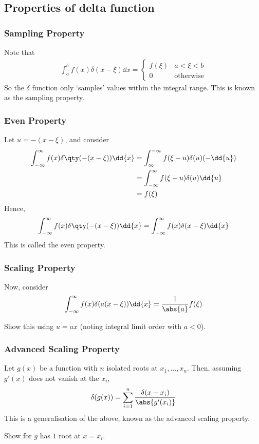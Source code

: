 \subsection{Properties of delta function}
\subsubsection{Sampling Property}
Note that
\begin{align} \label{eq:6.9}
	\int_a^b f(x) \delta(x-\xi) \dd{x} = \begin{cases}
		f(\xi) & a < \xi < b \\
		0 & \text{otherwise}
	\end{cases}
\end{align}
So the $\delta$ function only `samples' values within the integral range.
This is known as the sampling property.

\subsubsection{Even Property}
Let $u = -(x-\xi)$, and consider
\begin{align*}
	\int_{-\infty}^\infty f(x) \delta\qty(-(x-\xi)) \dd{x} &= \int_{\infty}^{-\infty} f(\xi - u) \delta(u) (-\dd{u}) \\
    &= \int_{-\infty}^\infty f(\xi - u) \delta(u) \dd{u} \\
    &= f(\xi)
\end{align*}
Hence,
\begin{align} \label{eq:6.10}
	\int_{-\infty}^\infty f(x) \delta\qty(-(x-\xi)) \dd{x} = \int_{-\infty}^\infty f(x) \delta(x-\xi) \dd{x}
\end{align}
This is called the even property.

\subsubsection{Scaling Property}
Now, consider
\begin{align} \label{eq:6.11}
	\int_{-\infty}^\infty f(x) \delta(a(x-\xi)) \dd{x} = \frac{1}{\abs{a}}f(\xi)
\end{align}

\begin{exercise}
	Show this using $u = ax$ (noting integral limit order with $a < 0$).
\end{exercise} 

\subsubsection{Advanced Scaling Property}
Let $g(x)$ be a function with $n$ isolated roots at $x_1, \dots, x_n$.
Then, assuming $g'(x)$ does not vanish at the $x_i$,
\begin{align} \label{eq:6.12}
	\delta(g(x)) = \sum_{i=1}^n \frac{\delta(x - x_i)}{\abs{g'(x_i)}}
\end{align}
This is a generalisation of the above, known as the advanced scaling property.
\begin{exercise}
	Show for $g$ has $1$ root at $x = x_i$.
\end{exercise} 

